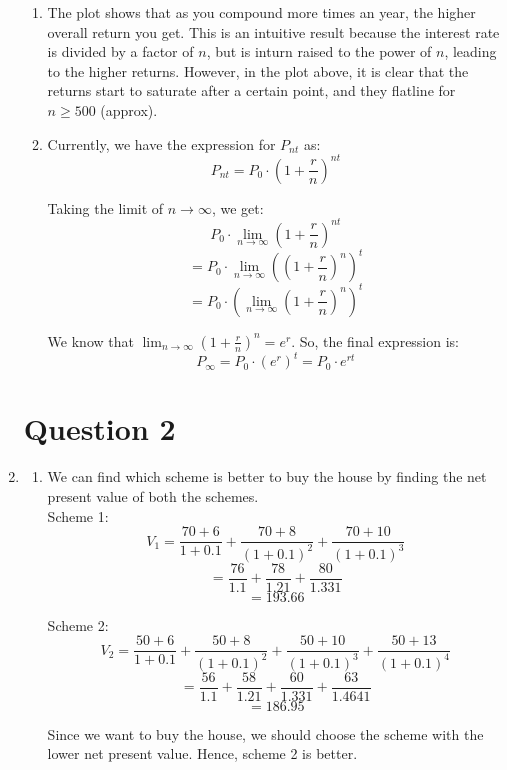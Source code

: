 \documentclass[a4paper]{article}
\begin{document}
\begin{enumerate}
\begin{enumerate}[label=(\alph*)]
        \item The plot shows that as you compound more times an year, the higher overall return you get. This is an intuitive result because the interest rate is divided by a factor of $n$, but is inturn raised to the power of $n$, leading to the higher returns. However, in the plot above, it is clear that the returns start to saturate after a certain point, and they flatline for $n \geq 500$ (approx).
        
        \newpage
        
        \item Currently, we have the expression for $P_{nt}$ as:
        \[ P_{nt} = P_0 \cdot (1 + \frac{r}{n})^{nt} \]

        Taking the limit of $n \rightarrow \infty$, we get:
        \[ P_0 \cdot \lim_{n \to \infty} (1 + \frac{r}{n})^{nt} \]
        \[ = P_0 \cdot \lim_{n \to \infty} ((1 + \frac{r}{n})^{n})^t \]
        \[ = P_0 \cdot (\lim_{n \to \infty} (1 + \frac{r}{n})^{n})^t \]

        We know that $\lim_{n \to \infty} (1 + \frac{r}{n})^{n} = e^r$. So, the final expression is:
        \[ P_{\infty} = P_0 \cdot (e^r)^t = P_0 \cdot e^{rt} \]
    \end{enumerate}

    \vspace{15mm}
    \section*{Question 2}
    \item \begin{enumerate}
        \item We can find which scheme is better to buy the house by finding the net present value of both the schemes. \\
        
        Scheme 1: \\
        \[ V_1 = \frac{70 + 6}{1 + 0.1} + \frac{70 + 8}{(1 + 0.1)^2} + \frac{70 + 10}{(1 + 0.1)^3} \]
        \[ = \frac{76}{1.1} + \frac{78}{1.21} + \frac{80}{1.331} \]
        \[ = 193.66 \]

        Scheme 2: \\
        \[ V_2 = \frac{50 + 6}{1 + 0.1} + \frac{50 + 8}{(1 + 0.1)^2} + \frac{50 + 10}{(1 + 0.1)^3} + \frac{50 + 13}{(1 + 0.1)^4} \]
        \[ = \frac{56}{1.1} + \frac{58}{1.21} + \frac{60}{1.331} + \frac{63}{1.4641} \]
        \[ = 186.95 \]

        Since we want to buy the house, we should choose the scheme with the lower net present value. Hence, scheme 2 is better.


\end{enumerate}
\end{enumerate}
\end{document}

